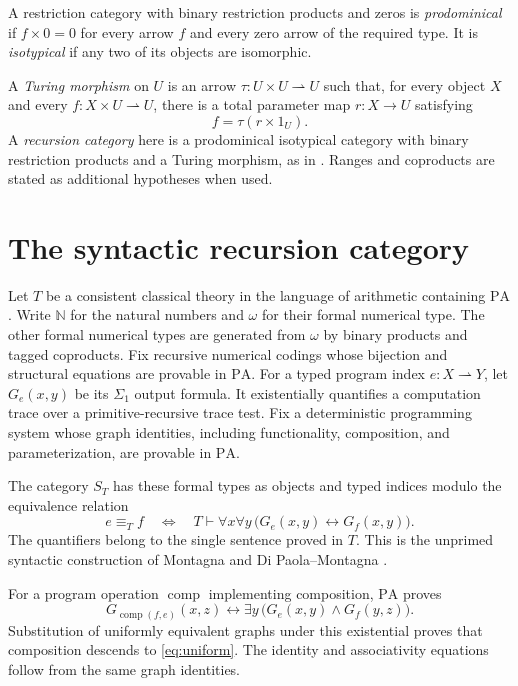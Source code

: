 \documentclass[11pt]{article}
\newcommand{\N}{\mathbb N}
\newcommand{\PA}{\mathrm{PA}}
\begin{document}
A restriction category with binary restriction products and zeros is
\emph{prodominical} if $f\times0=0$ for every arrow $f$ and every
zero arrow of the required type. It is \emph{isotypical} if any
two of its objects are isomorphic.

A \emph{Turing morphism} on $U$ is an arrow
$\tau:U\times U\rightharpoonup U$ such that, for every object $X$
and every $f:X\times U\rightharpoonup U$, there is a total
parameter map $r:X\to U$ satisfying
\[
 f=\tau(r\times1_U).
\]
A \emph{recursion category} here is a prodominical isotypical
category with binary restriction products and a Turing morphism,
as in \cite[Section 9]{Heller}.
Ranges and coproducts are stated as additional hypotheses when used.

\section{The syntactic recursion category}\label{sec:syntactic}

Let $T$ be a consistent classical theory in the language of arithmetic
containing $\PA$. Write $\N$ for the natural numbers and $\omega$
for their formal numerical type. The other formal numerical types are
generated from $\omega$ by binary products and tagged coproducts.
Fix recursive numerical codings
whose bijection and structural equations are provable in $\PA$.
For a typed program index $e:X\rightharpoonup Y$, let $G_e(x,y)$ be its
$\Sigma_1$ output formula. It existentially quantifies a computation trace
over a primitive-recursive trace test. Fix a deterministic programming
system whose graph identities, including functionality, composition,
and parameterization, are provable in $\PA$.

The category $S_T$ has these formal types as objects and typed indices
modulo the equivalence relation
\begin{equation}\label{eq:uniform}
 e\equiv_T f
 \quad\Longleftrightarrow\quad
 T\vdash \forall x\forall y\,
       \bigl(G_e(x,y)\leftrightarrow G_f(x,y)\bigr).
\end{equation}
The quantifiers belong to the single sentence proved in $T$.
This is the unprimed syntactic construction of Montagna and
Di Paola--Montagna \cite{Montagna,DPM}.

For a program operation $\operatorname{comp}$ implementing composition,
$\PA$ proves
\begin{equation}\label{eq:composition}
 G_{\operatorname{comp}(f,e)}(x,z)
 \leftrightarrow
 \exists y\,\bigl(G_e(x,y)\land G_f(y,z)\bigr).
\end{equation}
Substitution of uniformly equivalent graphs under this existential proves
that composition descends to \eqref{eq:uniform}. The identity and
associativity equations follow from the same graph identities.
\end{document}
